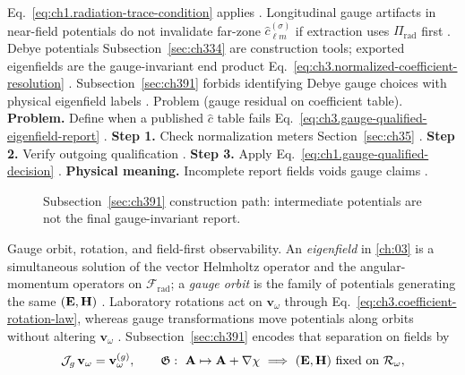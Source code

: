 Eq.~\eqref{eq:ch1.radiation-trace-condition} applies \cite{stratton1941}. Longitudinal gauge artifacts in near-field
potentials do not invalidate far-zone \(\widehat{c}_{\ell m}^{(\sigma)}\) if extraction uses \(\Pi_{\mathrm{rad}}\) first
\cite{harrington2001}.
Debye potentials Subsection~\ref{sec:ch334} are construction tools; exported eigenfields are the gauge-invariant end product
Eq.~\eqref{eq:ch3.normalized-coefficient-resolution} \cite{hansen1988}. Subsection~\ref{sec:ch391} forbids identifying
Debye gauge choices with physical eigenfield labels \cite{harrington2001}.
Problem (gauge residual on coefficient table). \textbf{Problem.} Define when a published \(\widehat{c}\) table fails Eq.~\eqref{eq:ch3.gauge-qualified-eigenfield-report}
\cite{harrington2001}.
\textbf{Step 1.} Check normalization meters Section~\ref{sec:ch35} \cite{hansen1988}.
\textbf{Step 2.} Verify outgoing qualification \cite{harrington2001}.
\textbf{Step 3.} Apply Eq.~\eqref{eq:ch1.gauge-qualified-decision} \cite{belinfante1940}.
\textbf{Physical meaning.} Incomplete report fields voids gauge claims \cite{stratton1941}.
\begin{figure}[t]
\centering
{}
\caption{Subsection~\ref{sec:ch391} construction path: intermediate potentials are not the final gauge-invariant report.}
\label{fig:ch3.391-construction-path}
\end{figure}
Gauge orbit, rotation, and field-first observability. An \emph{eigenfield} in \ref{ch:03} is a simultaneous solution of the vector Helmholtz operator and the angular-momentum operators on
\(\mathcal{F}_{\mathrm{rad}}\); a \emph{gauge orbit} is the family of potentials generating the same \((\mathbf{E},\mathbf{H})\)
\cite{belinfante1940}. Laboratory rotations act on \(\mathbf{v}_\omega\) through
Eq.~\eqref{eq:ch3.coefficient-rotation-law}, whereas gauge transformations move potentials along orbits without altering \(\mathbf{v}_\omega\)
\cite{jackson1999}. Subsection~\ref{sec:ch391} encodes that separation on fields by
\begin{equation}
\label{eq:ch3.gauge-rotation-commute-fields}
\mathcal{J}_{g}\,\mathbf{v}_\omega
=
\mathbf{v}_\omega^{(g)},
\qquad
\mathfrak{G}:\ \mathbf{A}\mapsto\mathbf{A}+\nabla\chi
\ \Longrightarrow\
(\mathbf{E},\mathbf{H})\ \text{fixed on }\mathcal{R}_\omega,
\end{equation}
